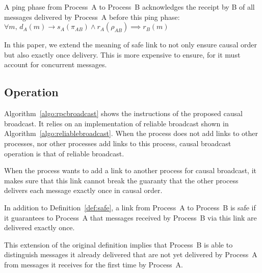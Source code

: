 \begin{lemma}
  A ping phase from Process~A to Process~B acknowledges the receipt by B of all
  messages delivered by Process~A before this ping phase:
  $\forall m,\, d_A(m) \rightarrow s_A(\pi_{AB}) \wedge r_A(\rho_{AB}) \implies
  r_B(m)$
\end{lemma}

In this paper, we extend the meaning of safe link to not only ensure causal
order but also exactly once delivery. This is more expensive to ensure, for it
must account for concurrent messages. 



\subsection{Operation}

Algorithm~\ref{algo:rpcbroadcast} shows the instructions of the proposed causal
broadcast. It relies on an implementation of reliable broadcast shown in
Algorithm~\ref{algo:reliablebroadcast}. When the process does not add links to
other processes, nor other processes add links to this process, causal broadcast
operation is that of reliable broadcast.

When the process wants to add a link to another process for causal broadcast, it
makes sure that this link cannot break the guaranty that the other process
delivers each message exactly once in causal order.


\begin{definition}
  In addition to Definition~\ref{def:safe}, a link from Process~A to Process~B
  is safe if it guarantees to Process~A that messages received by Process~B via
  this link are delivered exactly once.
  
\end{definition}

This extension of the original definition implies that Process~B is able to
distinguish messages it already delivered that are not yet delivered by
Process~A from messages it receives for the first time by Process~A.

